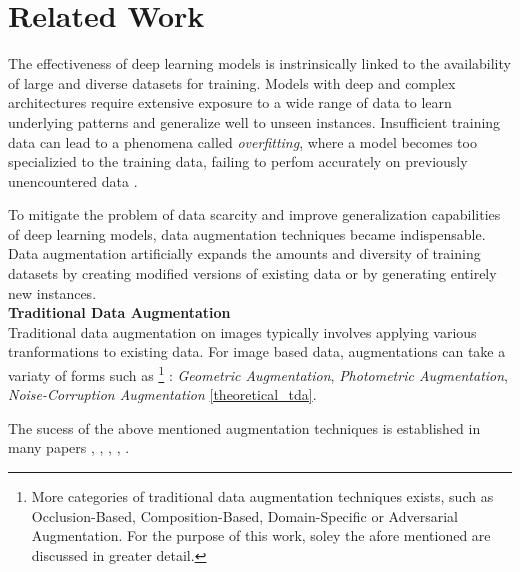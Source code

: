 \section{Related Work}\label{related_work}


The effectiveness of deep learning models is instrinsically linked to the availability of large and diverse datasets for training. Models with deep and complex architectures require extensive exposure to a wide range of data to learn underlying patterns and generalize well to unseen instances. Insufficient training data can lead to a phenomena called \textit{overfitting}, where a model becomes too specializied to the training data, failing to perfom accurately on previously unencountered data \cite{Ying2019overfittinganditssolutions}.

To mitigate the problem of data scarcity and improve generalization capabilities of deep learning models, data augmentation techniques became indispensable. Data augmentation artificially expands the amounts and diversity of training datasets by creating modified versions of existing data or by generating entirely new instances. \\

\noindent\textbf{Traditional Data Augmentation}\label{traditional_data_augmentation} \\
Traditional data augmentation on images typically involves applying various tranformations to existing data. For image based data, augmentations can take a variaty of forms such as
\footnote{More categories of traditional data augmentation techniques exists, such as Occlusion-Based, Composition-Based, Domain-Specific or Adversarial Augmentation. For the purpose of this work,  soley the afore mentioned are discussed in greater detail.}
: \textit{Geometric Augmentation}, \textit{Photometric Augmentation}, \textit{Noise-Corruption Augmentation} \ref{theoretical_tda}.

The sucess of the above mentioned augmentation techniques is established in many papers \cite{perez2017effectivenessdataaugmentationimage}, \cite{NIPS2012_c399862d}, \cite{Ying2019overfittinganditssolutions}, \cite{shorten2019survey}, \cite{WanLiZeiler2013}.\\






